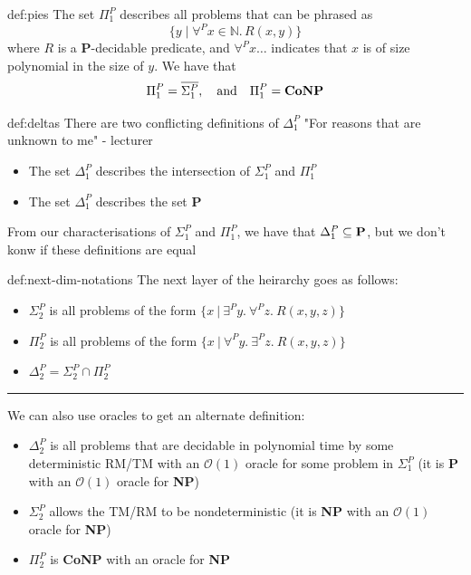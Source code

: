 \documentclass[landscape, 8pt]{extarticle}
\begin{document}
\begin{multicols}{3}
\begin{dfn}[Pi notation]{def:pies}{}
The set $\Pi^{P}_{1}$ describes all problems that can be phrased as
\[\{y \mid \forall^{P}x \in \mathbb{N} . \, R(x,y)\}\]
where $R$ is a \textbf{P}-decidable predicate, and $\forall^{P}x\dots$ indicates that $x$ is of size polynomial in the size of $y$.
\newline
We have that
\[\Pi^{P}_{1} = \overline{\Sigma^{P}_{1}},\quad\text{and}\quad \Pi^{P}_{1} = \text{\textbf{CoNP}}\]
\end{dfn}

\begin{dfn}{def:deltas}{}
There are two conflicting definitions of $\Delta^{P}_{1}$ "For reasons that are unknown to me" - lecturer
\renewcommand\labelitemi{\tiny$\bullet$}
\begin{itemize}
    \setlength\itemsep{0em}
    \item The set $\Delta^{P}_{1}$ describes the intersection of $\Sigma^{P}_{1}$ and $\Pi^{P}_{1}$
    \item The set $\Delta^{P}_{1}$ describes the set \textbf{P}
\end{itemize}
From our characterisations of $\Sigma^{P}_{1}$ and $\Pi^{P}_{1}$, we have that $\Delta^{P}_{1}\subseteq \text{\textbf{P}}$, but we don't konw if these definitions are equal
\end{dfn}


\begin{dfn}{def:next-dim-notations}{}
The next layer of the heirarchy goes as follows:
\begin{itemize}
    \item $\Sigma_2^P$ is all problems of the form $\{x \:|\: \exists^P y.\: \forall^P z.\: R(x,y,z)\}$
    \item $\Pi_2^P$ is all problems of the form $\{x \:|\: \forall^P y.\: \exists^P z.\: R(x,y,z)\}$
    \item $\Delta_2^P = \Sigma_2^P \cap \Pi_2^P$
\end{itemize}

\vspace{-5pt}
\noindent\rule{\textwidth}{0.2pt}
We can also use oracles to get an alternate definition:
\begin{itemize}
    \item $\Delta_2^P$ is all problems that are decidable in polynomial time by some deterministic RM/TM with an $\mathcal{O}(1)$ oracle for some problem in $\Sigma_1^P$ (it is \textbf{P} with an $\mathcal{O}(1)$ oracle for \textbf{NP})
    \item $\Sigma_2^P$ allows the TM/RM to be nondeterministic (it is \textbf{NP} with an $\mathcal{O}(1)$ oracle for \textbf{NP})
    \item $\Pi_2^P$ is \textbf{CoNP} with an oracle for \textbf{NP}
\end{itemize}


\end{dfn}
\end{multicols}
\end{document}
